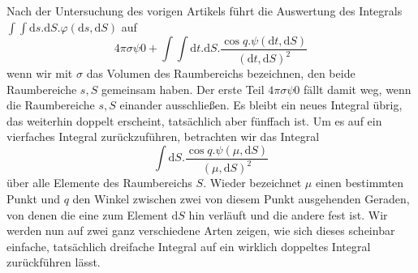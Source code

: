 Nach der Untersuchung des vorigen Artikels führt die Auswertung des Integrals $\int\int\mathrm{d}s.\mathrm{d}S.\varphi(\mathrm{d}s,\mathrm{d}S)$ auf
\[
4\pi\sigma\psi0+\int\int\mathrm{d}t.\mathrm{d}S.\frac{\cos q.\psi(\mathrm{d}t,\mathrm{d}S)}{(\mathrm{d}t,\mathrm{d}S)^2}
\]
wenn wir mit $\sigma$ das Volumen des Raumbereichs bezeichnen, den beide Raumbereiche $s,S$ gemeinsam haben. Der erste Teil $4\pi\sigma\psi0$ fällt damit weg, wenn die Raumbereiche $s,S$ einander ausschließen. Es bleibt ein neues Integral übrig, das weiterhin doppelt erscheint, tatsächlich aber fünffach ist. Um es auf ein vierfaches Integral zurückzuführen, betrachten wir das Integral
\[
\int\mathrm{d}S.\frac{\cos q.\psi(\mu,\mathrm{d}S)}{(\mu,\mathrm{d}S)^2}
\]
über alle Elemente des Raumbereichs $S$. Wieder bezeichnet $\mu$ einen bestimmten Punkt und $q$ den Winkel zwischen zwei von diesem Punkt ausgehenden Geraden, von denen die eine zum Element $\mathrm{d}S$ hin verläuft und die andere fest ist. Wir werden nun auf zwei ganz verschiedene Arten zeigen, wie sich dieses scheinbar einfache, tatsächlich dreifache Integral auf ein wirklich doppeltes Integral zurückführen lässt.

